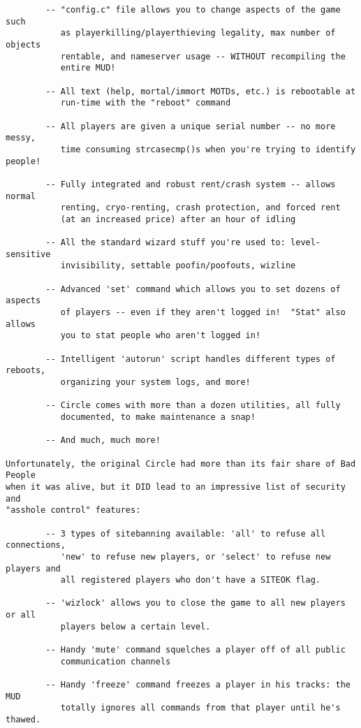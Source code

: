 \documentclass[11pt]{article}
\begin{document}
\begin{verbatim}
        -- "config.c" file allows you to change aspects of the game such
           as playerkilling/playerthieving legality, max number of objects
           rentable, and nameserver usage -- WITHOUT recompiling the
           entire MUD!

        -- All text (help, mortal/immort MOTDs, etc.) is rebootable at
           run-time with the "reboot" command

        -- All players are given a unique serial number -- no more messy,
           time consuming strcasecmp()s when you're trying to identify people!

        -- Fully integrated and robust rent/crash system -- allows normal
           renting, cryo-renting, crash protection, and forced rent
           (at an increased price) after an hour of idling

        -- All the standard wizard stuff you're used to: level-sensitive
           invisibility, settable poofin/poofouts, wizline

        -- Advanced 'set' command which allows you to set dozens of aspects
           of players -- even if they aren't logged in!  "Stat" also allows
           you to stat people who aren't logged in!

        -- Intelligent 'autorun' script handles different types of reboots,
           organizing your system logs, and more!

        -- Circle comes with more than a dozen utilities, all fully
           documented, to make maintenance a snap!

        -- And much, much more!

Unfortunately, the original Circle had more than its fair share of Bad People
when it was alive, but it DID lead to an impressive list of security and
"asshole control" features:

        -- 3 types of sitebanning available: 'all' to refuse all connections,
           'new' to refuse new players, or 'select' to refuse new players and
           all registered players who don't have a SITEOK flag.

        -- 'wizlock' allows you to close the game to all new players or all
           players below a certain level.

        -- Handy 'mute' command squelches a player off of all public
           communication channels

        -- Handy 'freeze' command freezes a player in his tracks: the MUD
           totally ignores all commands from that player until he's thawed.


\end{verbatim}
\end{document}

